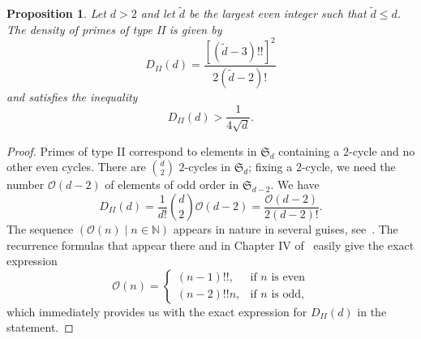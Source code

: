 \documentclass[11pt]{article}
\theoremstyle{plain}
\newtheorem{proposition}[theorem]{Proposition}
\theoremstyle{definition}
\theoremstyle{remark}
\numberwithin{equation}{section}
\newcommand{\NN}{\mathbb{N}}
\renewcommand{\SS}{\mathfrak{S}}
\begin{document}
\begin{proposition}\label{prop:type2}
  Let $d>2$ and let $\tilde{d}$ be the largest even integer such that 
  $\tilde{d}\leq d$.
  The density of primes of type II is given by
  \begin{equation*}
    D_{II}(d)=\frac{[(\tilde{d}-3)!!]^2}{2(\tilde{d}-2)!}
  \end{equation*}
  and satisfies the inequality
  \begin{equation*}
    D_{II}(d)>\frac{1}{4\sqrt{d}}.
  \end{equation*}
\end{proposition}
\begin{proof}
  Primes of type II correspond to elements in $\SS_d$ containing a $2$-cycle and no other
  even cycles. There are $\binom{d}{2}$ $2$-cycles in $\SS_d$; fixing a $2$-cycle, we 
  need the number $\mathscr{O}(d-2)$ of elements of odd order in $\SS_{d-2}$.
  We have
  \begin{equation*}
    D_{II}(d)=\frac{1}{d!}\binom{d}{2}\mathscr{O}(d-2)
    =\frac{\mathscr{O}(d-2)}{2(d-2)!}.
  \end{equation*}
  The sequence $(\mathscr{O}(n)\mid n\in\NN)$ appears in nature in several
  guises, see~\cite{OEIS}.  The recurrence formulas that appear there and in
  Chapter IV of~\cite{Riordan} easily give the exact expression
  \begin{equation*}
    \mathscr{O}(n)=\begin{cases}
        (n-1)!!,&\text{if }n\text{ is even}\\
        (n-2)!!n,&\text{if }n\text{ is odd,}
      \end{cases}
  \end{equation*}
  which immediately provides us with the 
  exact expression for $D_{II}(d)$ in the statement.


\end{proof}
\end{document}
